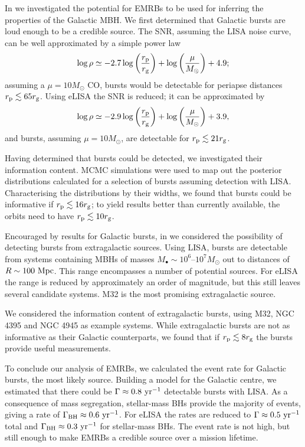 In  we investigated the potential for EMRBs to be used for inferring the properties of the Galactic MBH. We first determined that Galactic bursts are loud enough to be a credible source. The SNR, assuming the LISA noise curve, can be well approximated by a simple power law
\begin{equation}
\log\rho \simeq -2.7\log\left(\dfrac{r_\mathrm{p}}{r_\mathrm{g}}\right) + \log\left(\dfrac{\mu}{M_\odot}\right) + 4.9;
\end{equation}
assuming a $\mu = 10 M_\odot$ CO, bursts would be detectable for periapse distances $r_\mathrm{p} \lesssim 65 r_\mathrm{g}$. Using eLISA the SNR is reduced; it can be approximated by 
\begin{equation}
\log\rho \simeq -2.9\log\left(\dfrac{r_\mathrm{p}}{r_\mathrm{g}}\right) + \log\left(\dfrac{\mu}{M_\odot}\right) + 3.9,
\end{equation}
and bursts, assuming $\mu = 10 M_\odot$, are detectable for $r_\mathrm{p} \lesssim 21 r_\mathrm{g}$.

Having determined that bursts could be detected, we investigated their information content. MCMC simulations were used to map out the posterior distributions calculated for a selection of bursts assuming detection with LISA. Characterising the distributions by their widths, we found that bursts could be informative if $r_\mathrm{p} \lesssim 16 r_\mathrm{g}$; to yield results better than currently available, the orbits need to have $r_\mathrm{p} \lesssim 10 r_\mathrm{g}$.

Encouraged by results for Galactic bursts, in  we considered the possibility of detecting bursts from extragalactic sources. Using LISA, bursts are detectable from systems containing MBHs of masses $M_\bullet \sim 10^6$--$10^7 M_\odot$ out to distances of $R \sim 100~\mathrm{Mpc}$. This range encompasses a number of potential sources. For eLISA the range is reduced by approximately an order of magnitude, but this still leaves several candidate systems. M32 is the most promising extragalactic source.

We considered the information content of extragalactic bursts, using M32, NGC 4395 and NGC 4945 as example systems. While extragalactic bursts are not as informative as their Galactic counterparts, we found that if $r_\mathrm{p} \lesssim 8 r_\mathrm{g}$ the bursts provide useful measurements.

To conclude our analysis of EMRBs, we calculated the event rate for Galactic bursts, the most likely source. Building a model for the Galactic centre, we estimated that there could be $\Gamma \approx 0.8~\mathrm{yr^{-1}}$ detectable bursts with LISA. As a consequence of mass segregation, stellar-mass BHs provide the majority of events, giving a rate of $\Gamma_\mathrm{BH} \approx 0.6~\mathrm{yr^{-1}}$. For eLISA the rates are reduced to $\Gamma \approx 0.5~\mathrm{yr^{-1}}$ total and $\Gamma_\mathrm{BH} \approx 0.3~\mathrm{yr^{-1}}$ for stellar-mass BHs. The event rate is not high, but still enough to make EMRBs a credible source over a mission lifetime.

